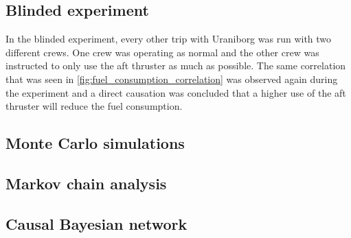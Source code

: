 \documentclass[fleqn,10pt]{olplainarticle}
\begin{document}
\subsection{Blinded experiment}\label{sec:blinded_experiment}
In the blinded experiment, every other trip with Uraniborg was run with two different crews. One crew was operating as normal and the other crew was instructed to only use the aft thruster as much as possible. The same correlation that was seen in \autoref{fig:fuel_consumption_correlation} was observed again during the experiment and a direct causation was concluded that a higher use of the aft thruster will reduce the fuel consumption.

\subsection{Monte Carlo simulations}
\subsection{Markov chain analysis}
\subsection{Causal Bayesian network}


\end{document}
